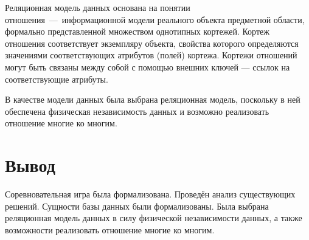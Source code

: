 Реляционная модель данных основана на понятии отношения~---~информационной модели реального объекта предметной области, формально представленной множеством однотипных кортежей. Кортеж отношения соответствует экземпляру объекта, свойства которого определяются значениями соответствующих атрибутов (полей) кортежа. Кортежи отношений могут быть связаны между собой с помощью внешних ключей — ссылок на соответствующие атрибуты.

В качестве модели данных была выбрана реляционная модель, поскольку в ней обеспечена физическая независимость данных и возможно реализовать отношение многие ко многим.

\section*{Вывод}

Соревновательная игра была формализована. Проведён анализ существующих решений. Сущности базы данных были формализованы. Была выбрана реляционная модель данных в силу физической независимости данных, а также возможности реализовать отношение многие ко многим.

\clearpage

